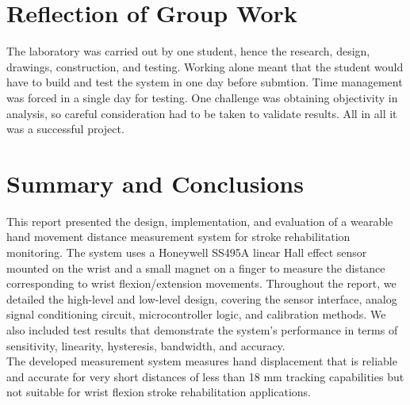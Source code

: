 \documentclass[a4paper,12pt]{article}
\begin{document}
\section{Reflection of Group Work}
The laboratory was carried out by one student, hence the research, design, drawings, construction, and testing. Working alone meant that the student would have to build and test the system in one day before submtion. Time management was forced in a single day for testing. One challenge was obtaining objectivity in analysis, so careful consideration had to be taken to validate results. All in all it was a successful project.


%
\section{Summary and Conclusions}
This report presented the design, implementation, and evaluation of a wearable hand movement distance measurement system for stroke rehabilitation monitoring. The system uses a Honeywell SS495A linear Hall effect sensor mounted on the wrist and a small magnet on a finger to measure the distance corresponding to wrist flexion/extension movements. Throughout the report, we detailed the high-level and low-level design, covering the sensor interface, analog signal conditioning circuit, microcontroller logic, and calibration methods. We also included test results that demonstrate the system’s performance in terms of sensitivity, linearity, hysteresis, bandwidth, and accuracy.\\
The developed measurement system measures hand displacement that is reliable and accurate for very short distances of less than 18 mm tracking capabilities but not suitable for wrist flexion stroke rehabilitation applications.


%
\newpage



\end{document}
